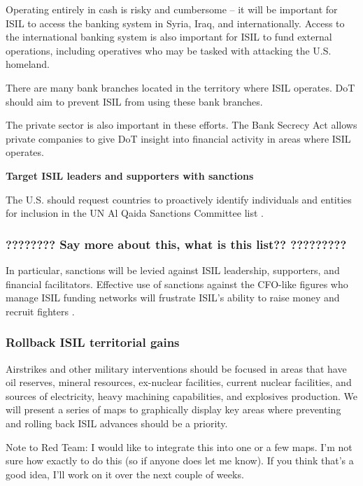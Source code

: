 \documentclass{report}
\begin{document}
Operating entirely in cash is risky and cumbersome – it will be important for ISIL to access the banking system in Syria, Iraq, and internationally. Access to the international banking system is also important for ISIL to fund external operations, including operatives who may be tasked with attacking the U.S. homeland. 

There are many bank branches located in the territory where ISIL operates. DoT should aim to prevent ISIL from using these bank branches. 

The private sector is also important in these efforts. The Bank Secrecy Act allows private companies to give DoT insight into financial activity in areas where ISIL operates. 

\textbf{Target ISIL leaders and supporters with sanctions}

The U.S. should request countries to proactively identify individuals and entities for inclusion in the UN Al Qaida Sanctions Committee list \cite{Report2015}.

 \subsubsection{???????? Say more about this, what is this list??   ?????????}

In particular, sanctions will be levied against ISIL leadership, supporters, and financial facilitators. Effective use of sanctions against the CFO-like figures who manage ISIL funding networks will frustrate ISIL's ability to raise money and recruit fighters \cite{Cohen2014}.

\subsubsection{Rollback ISIL territorial gains}

Airstrikes and other military interventions should be focused in areas that have oil reserves, mineral resources, ex-nuclear facilities, current nuclear facilities, and sources of electricity, heavy machining capabilities, and explosives production. We will present a series of maps to graphically display key areas where preventing and rolling back ISIL advances should be a priority.

Note to Red Team: I would like to integrate this into one or a few maps. I'm not sure how exactly to do this (so if anyone does let me know). If you think that's a good idea, I'll work on it over the next couple of weeks.
\end{document}

